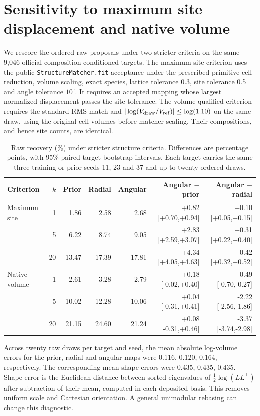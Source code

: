 \section{Sensitivity to maximum site displacement and native volume}\label{app:csp-sensitivity}
We rescore the ordered raw proposals under two stricter criteria on the same 9,046 official composition-conditioned targets. The maximum-site criterion uses the public \texttt{StructureMatcher.fit} acceptance under the prescribed primitive-cell reduction, volume scaling, exact species, lattice tolerance 0.3, site tolerance 0.5 and angle tolerance $10^\circ$. It requires an accepted mapping whose largest normalized displacement passes the site tolerance. The volume-qualified criterion requires the standard RMS match and $|\log(V_{\rm draw}/V_{\rm ref})|\leq\log(1.10)$ on the same draw, using the original cell volumes before matcher scaling. Their compositions, and hence site counts, are identical.
\begin{table}[!htbp]\centering\scriptsize
\caption{Raw recovery (\%) under stricter structure criteria. Differences are percentage points, with 95\% paired target-bootstrap intervals. Each target carries the same three training or prior seeds 11, 23 and 37 and up to twenty ordered draws.}\label{tab:csp-sensitivity}
\setlength{\tabcolsep}{3.3pt}\begin{tabular}{lrrrrrr}\hline
Criterion & $k$ & Prior & Radial & Angular & Angular $-$ prior & Angular $-$ radial\\\hline
Maximum site & 1 & 1.86 & 2.58 & 2.68 & +0.82 [+0.70,+0.94] & +0.10 [+0.05,+0.15]\\
 & 5 & 6.22 & 8.74 & 9.05 & +2.83 [+2.59,+3.07] & +0.31 [+0.22,+0.40]\\
 & 20 & 13.47 & 17.39 & 17.81 & +4.34 [+4.05,+4.63] & +0.42 [+0.32,+0.52]\\
Native volume & 1 & 2.61 & 3.28 & 2.79 & +0.18 [-0.02,+0.40] & -0.49 [-0.70,-0.27]\\
 & 5 & 10.02 & 12.28 & 10.06 & +0.04 [-0.31,+0.41] & -2.22 [-2.56,-1.86]\\
 & 20 & 21.15 & 24.60 & 21.24 & +0.08 [-0.31,+0.46] & -3.37 [-3.74,-2.98]\\
\hline\end{tabular}\end{table}
Across twenty raw draws per target and seed, the mean absolute log-volume errors for the prior, radial and angular maps were 0.116, 0.120, 0.164, respectively. The corresponding mean shape errors were 0.435, 0.435, 0.435. Shape error is the Euclidean distance between sorted eigenvalues of $\frac12\log(LL^\top)$ after subtraction of their mean, computed in each deposited basis. This removes uniform scale and Cartesian orientation. A general unimodular rebasing can change this diagnostic.
